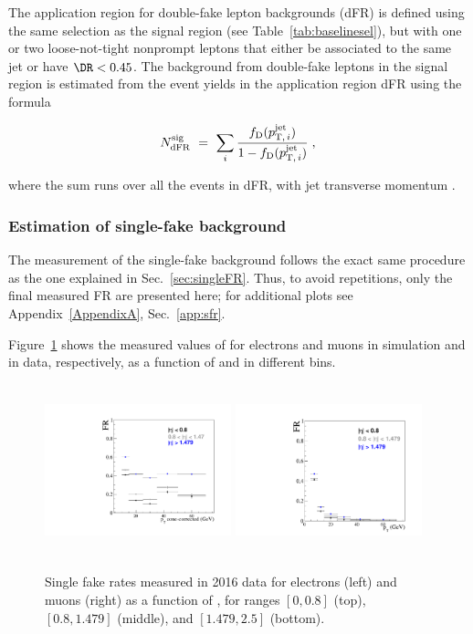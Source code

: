 The application region for double-fake lepton backgrounds (dFR)
is defined using the same selection as the signal region (see
Table~\ref{tab:baselinesel}), but with one or two loose-not-tight
nonprompt leptons that either be associated to the same jet or have $\DR<0.45$. 
The background from double-fake leptons in the signal region is
estimated from the event yields in the application region dFR using
the formula
\begin{linenomath}
  \begin{equation}
    \label{eq:dFRbkg}
    N_{\mathrm{dFR}}^{\mathrm{sig}} ~=~ 
    \sum_i\frac{f_{\mathrm{D}}(p_{\mathrm{T,\,}i}^{\mathrm{jet}})}{1-f_{\mathrm{D}}(p_{\mathrm{T,\,}i}^{\mathrm{jet}})}\;,
  \end{equation}
\end{linenomath}
where the sum runs over all the events in dFR, with jet transverse momentum .
\vspace{5cm}
\subsubsection{Estimation of single-fake background}
\label{sec:singleFakeBkg}

The measurement of the single-fake background follows the exact same
procedure as the one explained in Sec.~\ref{sec:singleFR}. Thus, to
avoid repetitions, only the final measured FR are presented here; for
additional plots see Appendix~\ref{AppendixA}, Sec.~\ref{app:sfr}.

Figure~\ref{fig:sfr_data} shows the measured
values of \sfr for electrons and muons in simulation and in data,
respectively, as a function of \ptc and in different \abseta bins.
\begin{figure}[h]
  \centering
  \includegraphics[height=5cm, width=5.4cm]{Figures/c6/backgrounds/FR/sFR/data/electrons.pdf}
  \includegraphics[height=5cm, width=5.4cm]{Figures/c6/backgrounds/FR/sFR/data/muons.pdf}\\
  \caption{Single fake rates measured in 2016 data for electrons (left) and
    muons (right) as a function of \ptc, for \abseta ranges $[0,0.8]$
    (top), $[0.8,1.479]$ (middle), and $[1.479,2.5]$ (bottom).}
  \label{fig:sfr_data}
\end{figure}

